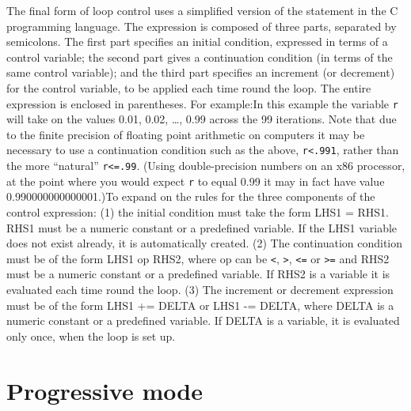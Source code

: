 The final form of loop control uses a simplified version of the
 statement in the C programming language.  The expression is
composed of three parts, separated by semicolons.  The first part
specifies an initial condition, expressed in terms of a control
variable; the second part gives a continuation condition (in terms of
the same control variable); and the third part specifies an increment
(or decrement) for the control variable, to be applied each time round
the loop.  The entire expression is enclosed in parentheses.  For
example:In this example the
variable \verb+r+ will take on the values 0.01, 0.02, \dots{}, 0.99
across the 99 iterations.  Note that due to the finite precision of
floating point arithmetic on computers it may be necessary to use a
continuation condition such as the above, \verb+r<.991+, rather than
the more ``natural'' \verb+r<=.99+.  (Using double-precision numbers
on an x86 processor, at the point where you would expect \verb+r+ to
equal 0.99 it may in fact have value 0.990000000000001.)To expand on
the rules for the three components of the control expression: (1) the
initial condition must take the form LHS1 = RHS1.  RHS1 must be a
numeric constant or a predefined variable.  If the LHS1 variable does
not exist already, it is automatically created.  (2) The continuation
condition must be of the form LHS1 op RHS2, where op can be \verb+<+,
\verb+>+, \verb+<=+ or \verb+>=+ and RHS2 must be a numeric constant
or a predefined variable.  If RHS2 is a variable it is evaluated each
time round the loop.  (3) The increment or decrement expression must
be of the form LHS1 += DELTA or LHS1 -= DELTA, where DELTA is a
numeric constant or a predefined variable.  If DELTA is a variable, it
is evaluated only once, when the loop is set up.
      

\section{Progressive mode}
\label{loop-progressive}

